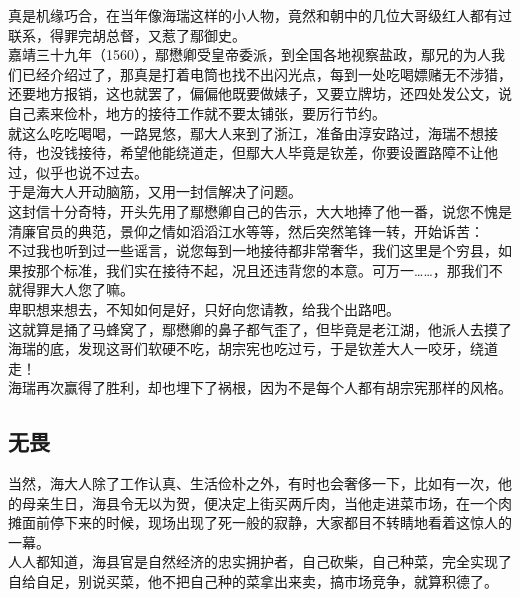 \begin{multicols}{\theparacolNo}
真是机缘巧合，在当年像海瑞这样的小人物，竟然和朝中的几位大哥级红人都有过联系，得罪完胡总督，又惹了鄢御史。\\

嘉靖三十九年（1560），鄢懋卿受皇帝委派，到全国各地视察盐政，鄢兄的为人我们已经介绍过了，那真是打着电筒也找不出闪光点，每到一处吃喝嫖赌无不涉猎，还要地方报销，这也就罢了，偏偏他既要做婊子，又要立牌坊，还四处发公文，说自己素来俭朴，地方的接待工作就不要太铺张，要厉行节约。\\

就这么吃吃喝喝，一路晃悠，鄢大人来到了浙江，准备由淳安路过，海瑞不想接待，也没钱接待，希望他能绕道走，但鄢大人毕竟是钦差，你要设置路障不让他过，似乎也说不过去。\\

于是海大人开动脑筋，又用一封信解决了问题。\\

这封信十分奇特，开头先用了鄢懋卿自己的告示，大大地捧了他一番，说您不愧是清廉官员的典范，景仰之情如滔滔江水等等，然后突然笔锋一转，开始诉苦：\\

不过我也听到过一些谣言，说您每到一地接待都非常奢华，我们这里是个穷县，如果按那个标准，我们实在接待不起，况且还违背您的本意。可万一……，那我们不就得罪大人您了嘛。\\

卑职想来想去，不知如何是好，只好向您请教，给我个出路吧。\\

这就算是捅了马蜂窝了，鄢懋卿的鼻子都气歪了，但毕竟是老江湖，他派人去摸了海瑞的底，发现这哥们软硬不吃，胡宗宪也吃过亏，于是钦差大人一咬牙，绕道走！\\

海瑞再次赢得了胜利，却也埋下了祸根，因为不是每个人都有胡宗宪那样的风格。\\

\subsection{无畏}
当然，海大人除了工作认真、生活俭朴之外，有时也会奢侈一下，比如有一次，他的母亲生日，海县令无以为贺，便决定上街买两斤肉，当他走进菜市场，在一个肉摊面前停下来的时候，现场出现了死一般的寂静，大家都目不转睛地看着这惊人的一幕。\\

人人都知道，海县官是自然经济的忠实拥护者，自己砍柴，自己种菜，完全实现了自给自足，别说买菜，他不把自己种的菜拿出来卖，搞市场竞争，就算积德了。\\


\end{multicols}
